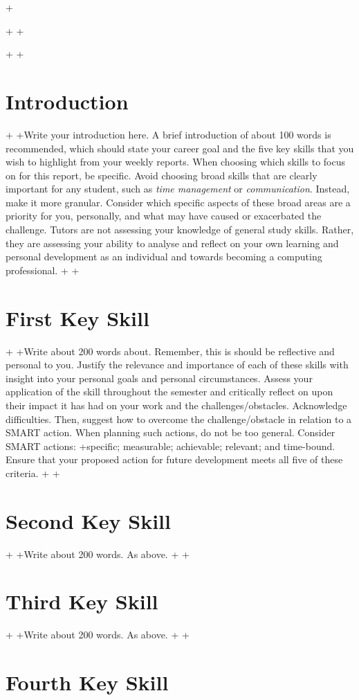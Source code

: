 +\documentclass{scrartcl}
\begin{document}
 +
 +\maketitle
 +
 +\section{Introduction}
 +
 +Write your introduction here. A brief introduction of about 100 words is recommended, which should state your career goal and the five key skills that you wish to highlight from your weekly reports. When choosing which skills to focus on for this report, be specific. Avoid choosing broad skills that are clearly important for any student, such as \textit{time management} or \textit{communication}. Instead, make it more granular. Consider which specific aspects of these broad areas are a priority for you, personally, and what may have caused or exacerbated the challenge. Tutors are not assessing your knowledge of general study skills. Rather, they are assessing your ability to analyse and reflect on your own learning and personal development as an individual and towards becoming a computing professional.
 +
 +\section{First Key Skill}
 +
 +Write about 200 words about. Remember, this is should be reflective and personal to you. Justify the relevance and importance of each of these skills with insight into your personal goals and personal circumstances. Assess your application of the skill throughout the semester and critically reflect on upon their impact it has had on your work and the challenges/obstacles. Acknowledge difficulties. Then, suggest how to overcome the challenge/obstacle in relation to a SMART action. When planning such actions, do not be too general. Consider SMART actions:
 +specific; measurable; achievable; relevant; and time-bound. Ensure that your proposed action for future development meets all five of these criteria.
 +
 +\section{Second Key Skill}
 +
 +Write about 200 words. As above.
 +
 +\section{Third Key Skill}
 +
 +Write about 200 words. As above.
 +
 +\section{Fourth Key Skill}
\end{document}
